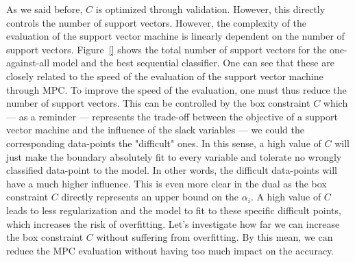 As we said before, $C$ is optimized through validation. However, this directly controls the number of support vectors. However, the complexity of the evaluation of the support vector machine is linearly dependent on the number of support vectors. Figure~\ref{} shows the total number of support vectors for the one-against-all model and the best sequential classifier. One can see that these are closely related to the speed of the evaluation of the support vector machine through MPC. To improve the speed of the evaluation, one must thus reduce the number of support vectors. This can be controlled by the box constraint $C$ which --- as a reminder --- represents the trade-off between the objective of a support vector machine and the influence of the slack variables --- we could the corresponding data-points the "difficult" ones. In this sense, a high value of $C$ will just make the boundary absolutely fit to every variable and tolerate no wrongly classified data-point to the model. In other words, the difficult data-points will have a much higher influence. This is even more clear in the dual as the box constraint $C$ directly represents an upper bound on the $\alpha_i$. A high value of $C$ leads to less regularization and the model to fit to these specific difficult points, which increases the risk of overfitting. Let's investigate how far we can increase the box constraint $C$ without suffering from overfitting. By this mean, we can reduce the MPC evaluation without having too much impact on the accuracy.